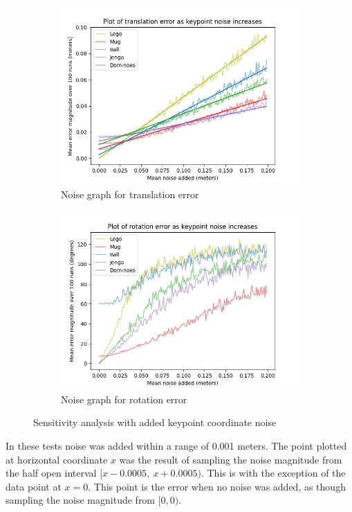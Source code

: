 \begin{figure}[h]
    \centering
    \begin{subfigure}[t]{0.49\textwidth}
        \includegraphics[width=\textwidth]{figures/fig_coordinate_noise-translation.png}
        \caption{Noise graph for translation error}
        \label{fig:noise-coord-translation}
    \end{subfigure}
    \hfill
    \begin{subfigure}[t]{0.49\textwidth}
        \includegraphics[width=\textwidth]{figures/fig_coordinate_noise-rotation.png}
        \caption{Noise graph for rotation error}
        \label{fig:noise-coord-rotation}
    \end{subfigure}
    \caption{Sensitivity analysis with added keypoint coordinate noise}
    \label{fig:noise-coord}
\end{figure}
In these tests noise was added within a range of 0.001 meters. The point plotted at horizontal coordinate $x$ was the result of sampling the noise magnitude from the half open interval $[x-0.0005,\: x+0.0005)$. This is with the exception of the data point at $x=0$. This point is the error when no noise was added, as though sampling the noise magnitude from $[0,0).$

